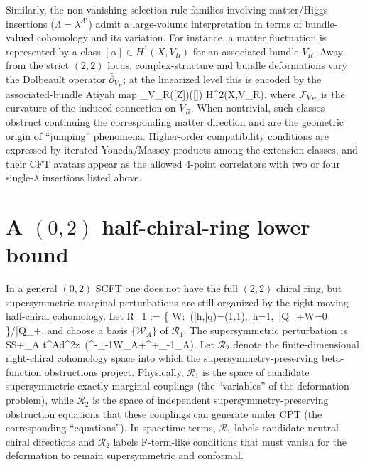 \documentclass[12pt]{article}
\newcommand{\wt}[1]{\widetilde{#1}}
\begin{document}
		Similarly, the non-vanishing selection-rule families involving matter/Higgs insertions ($\Lambda=\lambda^{A'}$) admit a large-volume interpretation in terms of bundle-valued cohomology and its variation. For instance, a matter fluctuation is represented by a class $[\alpha]\in H^{1}(X,V_R)$ for an associated bundle $V_R$. Away from the strict $(2,2)$ locus, complex-structure and bundle deformations vary the Dolbeault operator $\bar\partial_{V_R}$; at the linearized level this is encoded by the associated-bundle Atiyah map
		\ie
		\alpha_{V_R}([Z])([\alpha]) \;\equiv{}\;\in\; H^{2}(X,V_R),
		\fe
		where ${\cal F}_{V_R}$ is the curvature of the induced connection on $V_R$. When nontrivial, such classes obstruct continuing the corresponding matter direction and are the geometric origin of ``jumping'' phenomena. Higher-order compatibility conditions are expressed by iterated Yoneda/Massey products among the extension classes, and their CFT avatars appear as the allowed 4-point correlators with two or four single-$\lambda$ insertions listed above.
		
		\section{A $(0,2)$ half-chiral-ring lower bound}\label{sec:02_half_chiral_bound}
		
		In a general $(0,2)$ SCFT one does not have the full $(2,2)$ chiral ring, but supersymmetric marginal perturbations are still organized by the right-moving half-chiral cohomology. Let
		\ie
		\mathcal R_1
		\;:=\;
		\left\{
		\mathcal W:\ (\bar h,\bar q)=\left({1},1\right),~h=1,~\bar Q_+\mathcal W=0
		\right\}/\bar Q_+,
		\fe
		and choose a basis $\{\mathcal W_A\}$ of $\mathcal R_1$. The supersymmetric perturbation is
		\ie\label{eq:02_bound_pert}
		S\;\to\;S+\sum_{A} t^A\int d^2z~\Big(\wt G^-_{-{1}}\mathcal W_A+\wt G^+_{-{1}}_A\Big).
		\fe
		Let $\mathcal R_2$ denote the finite-dimensional right-chiral cohomology space into which the supersymmetry-preserving beta-function obstructions project.
		Physically, $\mathcal R_1$ is the space of candidate supersymmetric exactly marginal couplings (the ``variables'' of the deformation problem), while $\mathcal R_2$ is the space of independent supersymmetry-preserving obstruction equations that these couplings can generate under CPT (the corresponding ``equations''). In spacetime terms, $\mathcal R_1$ labels candidate neutral chiral directions and $\mathcal R_2$ labels F-term-like conditions that must vanish for the deformation to remain supersymmetric and conformal.
		
\end{document}

